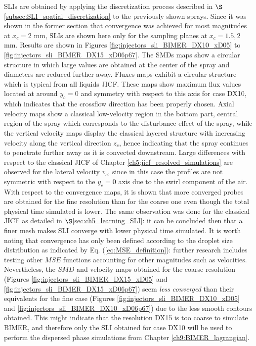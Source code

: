 


\newcommand\scaleSLIBIMER{0.175}

SLIs are obtained by applying the discretization process described in $\S$\ref{subsec:SLI_spatial_discretization} to the previously shown sprays. Since it was shown in the former section that convergence was achieved for most magnitudes at $x_c = 2$ mm, SLIs are shown here only for the sampling planes at $x_c = 1.5, 2$ mm. Results are shown in Figures \ref{fig:injectors_sli_BIMER_DX10_xD05} to  \ref{fig:injectors_sli_BIMER_DX15_xD06p67}. The SMDs maps show a circular structure in which large values are obtained at the center of the spray and diameters are reduced further away. Fluxes maps exhibit a circular structure which is typical from all liquids JICF. These maps show maximum flux values located at around $y_c = 0$ and symmetry with respect to this axis for case DX10, which indicates that the crossflow direction has been properly chosen. Axial velocity maps show a classical low-velocity region in the bottom part, central region of the spray which corresponds to the disturbance effect of the spray, while the vertical velocity maps display the classical layered structure with increasing velocity along the vertical direction $z_c$, hence indicating that the spray continues to penetrate further away as it is convected downstream. Large differences with respect to the classical JICF of Chapter \ref{ch5:jicf_resolved_simulations} are observed for the lateral velocity $v_c$, since in this case the profiles are not symmetric with respect to the $y_c = 0$ axis due to the swirl component of the air. With respect to the convergence maps, it is shown that more converged probes are obtained for the fine resolution than for the coarse one even though the total physical time simulated is lower. The same observation was done for the classical JICF as detailed in $\S$\ref{sec:ch5_learning_SLI}: it can be concluded then that a finer mesh makes SLI converge with lower physical time simulated. It is worth noting that convergence has only been defined according to the droplet size distribution as indicated by Eq. (\ref{eq:MSE_definition}): further research includes testing other $MSE$ functions accounting for other magnitudes such as velocities. Nevertheless, the $SMD$ and velocity maps obtained for the coarse resolution (Figures \ref{fig:injectors_sli_BIMER_DX15_xD05} and \ref{fig:injectors_sli_BIMER_DX15_xD06p67}) seem \textsl{less converged} than their equivalents for the fine case (Figures \ref{fig:injectors_sli_BIMER_DX10_xD05} and \ref{fig:injectors_sli_BIMER_DX10_xD06p67}) due to the less smooth contours obtained. This might indicate that the resolution DX15 is too coarse to simulate BIMER, and therefore only the SLI obtained for case DX10 will be used to perform the dispersed phase simulations from Chapter \ref{ch9:BIMER_lagrangian}.



